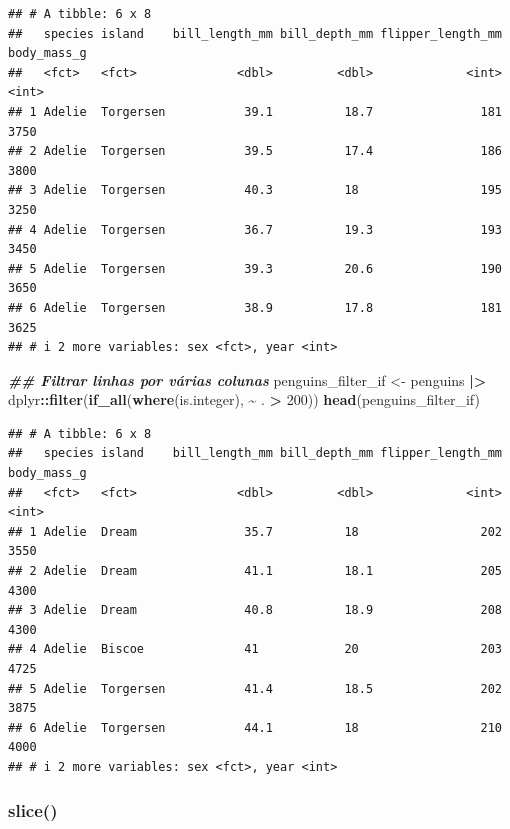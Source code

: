 \documentclass[
]{article}
\newenvironment{Shaded}{\begin{snugshade}}{\end{snugshade}}
\newcommand{\DecValTok}[1]{\textcolor[rgb]{0.00,0.00,0.81}{#1}}
\newcommand{\DocumentationTok}[1]{\textcolor[rgb]{0.56,0.35,0.01}{\textbf{\textit{#1}}}}
\newcommand{\FunctionTok}[1]{\textcolor[rgb]{0.13,0.29,0.53}{\textbf{#1}}}
\newcommand{\NormalTok}[1]{#1}
\newcommand{\OtherTok}[1]{\textcolor[rgb]{0.56,0.35,0.01}{#1}}
\newcommand{\SpecialCharTok}[1]{\textcolor[rgb]{0.81,0.36,0.00}{\textbf{#1}}}
\begin{document}
\begin{verbatim}
## # A tibble: 6 x 8
##   species island    bill_length_mm bill_depth_mm flipper_length_mm body_mass_g
##   <fct>   <fct>              <dbl>         <dbl>             <int>       <int>
## 1 Adelie  Torgersen           39.1          18.7               181        3750
## 2 Adelie  Torgersen           39.5          17.4               186        3800
## 3 Adelie  Torgersen           40.3          18                 195        3250
## 4 Adelie  Torgersen           36.7          19.3               193        3450
## 5 Adelie  Torgersen           39.3          20.6               190        3650
## 6 Adelie  Torgersen           38.9          17.8               181        3625
## # i 2 more variables: sex <fct>, year <int>
\end{verbatim}

\begin{Shaded}
\begin{Highlighting}[]
\DocumentationTok{\#\# Filtrar linhas por várias colunas}
\NormalTok{penguins\_filter\_if }\OtherTok{\textless{}{-}}\NormalTok{ penguins }\SpecialCharTok{|\textgreater{}} 
\NormalTok{    dplyr}\SpecialCharTok{::}\FunctionTok{filter}\NormalTok{(}\FunctionTok{if\_all}\NormalTok{(}\FunctionTok{where}\NormalTok{(is.integer), }\SpecialCharTok{\textasciitilde{}}\NormalTok{ . }\SpecialCharTok{\textgreater{}} \DecValTok{200}\NormalTok{))}
\FunctionTok{head}\NormalTok{(penguins\_filter\_if)}
\end{Highlighting}
\end{Shaded}

\begin{verbatim}
## # A tibble: 6 x 8
##   species island    bill_length_mm bill_depth_mm flipper_length_mm body_mass_g
##   <fct>   <fct>              <dbl>         <dbl>             <int>       <int>
## 1 Adelie  Dream               35.7          18                 202        3550
## 2 Adelie  Dream               41.1          18.1               205        4300
## 3 Adelie  Dream               40.8          18.9               208        4300
## 4 Adelie  Biscoe              41            20                 203        4725
## 5 Adelie  Torgersen           41.4          18.5               202        3875
## 6 Adelie  Torgersen           44.1          18                 210        4000
## # i 2 more variables: sex <fct>, year <int>
\end{verbatim}

\hypertarget{slice}{%
\subsubsection{slice()}\label{slice}}
\end{document}
